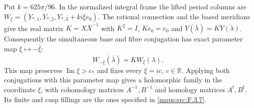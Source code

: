 \begin{remark}
\label{rem:V:conjugation-parameter}
Put $k=625\pi/96$. In the normalized integral frame the lifted
period columns are
$W_\xi=(Y_{*,1},Y_{*,2},Y_{*,3}+ki\xi e_0)$.
The rational connection and the based meridians give the real
matrix $K=X\bar X^{-1}$ with
$K^2=I$, $Ke_0=e_0$ and
$Y(\bar\lambda)=K\overline{Y(\lambda)}$.
Consequently the simultaneous base and fibre conjugation has
exact parameter map $\xi\mapsto-\bar\xi$:
\[
 \overline{W_{-\bar\xi}(\bar\lambda)}=K W_\xi(\lambda).
\]
This map preserves $\operatorname{Im}\xi>c_*$ and fixes every
$\xi=ic$, $c\in\mathbb R$. Applying both conjugations with this
parameter map gives a holomorphic family in the coordinate
$\xi$, with cohomology matrices $A^{-1},B^{-1}$ and homology
matrices $A^t,B^t$. Its finite and cusp fillings are the ones
specified in \cref{maps:src:F.3.7}.
\end{remark}
